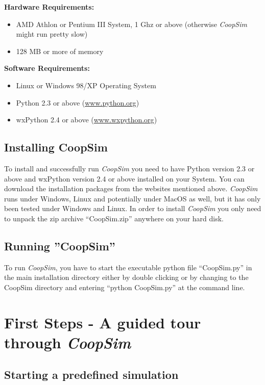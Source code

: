 \documentclass[12pt,a4paper,USenglish]{article}
\begin{document}
\noindent \textbf{Hardware Requirements:}

\begin{itemize}
\item AMD Athlon or Pentium III System, 1 Ghz or above (otherwise
\emph{CoopSim} might run pretty slow)
\item 128 MB or more of memory

\end{itemize}

\noindent \textbf{Software Requirements:}

\begin{itemize}
\item Linux or Windows 98/XP Operating System
\item Python 2.3 or above (\url{www.python.org})
\item wxPython 2.4 or above (\url{www.wxpython.org})
\end{itemize}

\subsection{Installing CoopSim}

To install and successfully run {\em CoopSim} you need to have Python
version 2.3 or above and wxPython version 2.4 or above installed on
your System. You can download the installation packages from the websites
mentioned above. \emph{CoopSim} runs under Windows, Linux and potentially 
under MacOS as well, but it has only been tested under Windows and Linux.
In order to install \emph{CoopSim} you only need to unpack the zip archive
``CoopSim.zip'' anywhere on your hard disk.


\subsection{Running ''CoopSim''}

To run \emph{CoopSim}, you have to start the executable python file
``CoopSim.py'' in the main installation directory either by double
clicking or by changing to the CoopSim directory and entering ``python
CoopSim.py'' at the command line.


\section{First Steps - A guided tour through \emph{CoopSim}}


\subsection{Starting a predefined simulation}
\end{document}
